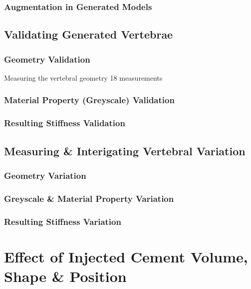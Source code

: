 \subsubsection{Augmentation in Generated Models}



\subsection{Validating Generated Vertebrae}

\subsubsection{Geometry Validation}

Measuring the vertebral geometry 18 measurements

\subsubsection{Material Property (Greyscale) Validation}

\subsubsection{Resulting Stiffness Validation}


\subsection{Measuring \& Interigating Vertebral Variation}

\subsubsection{Geometry Variation}

\subsubsection{Greyscale \& Material Property Variation}

\subsubsection{Resulting Stiffness Variation}

\section{Effect of Injected Cement Volume, Shape \& Position}



